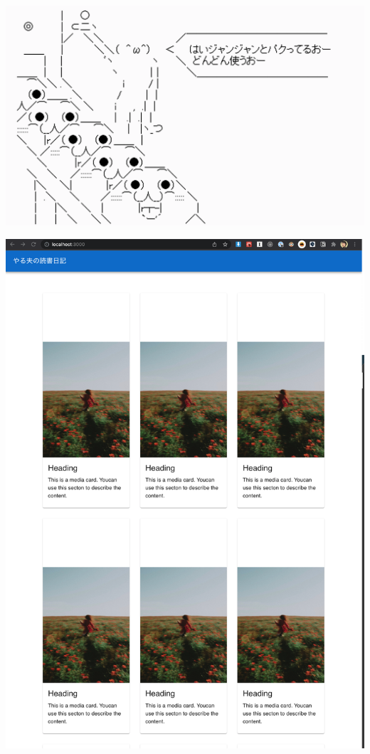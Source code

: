 \begin{reviewimage}[H]%
\includegraphics[width=0.6\maxwidth]{./images/03-todo-with-react/yaruo-ui02.png}%
\label{image:03-todo-with-react:yaruo-ui02}
\end{reviewimage}
\begin{reviewimage}%
\includegraphics[width=0.8\maxwidth]{./images/03-todo-with-react/mui008-album-done.png}%
\label{image:03-todo-with-react:mui008-album-done}
\end{reviewimage}

